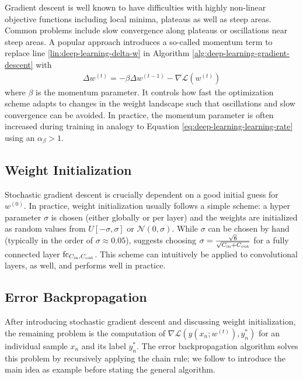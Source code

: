Gradient descent is well known to have difficulties with highly non-linear
objective functions including local minima, plateaus as well as steep areas.
Common problems include slow convergence along plateaus or oscillations near
steep areas. A popular approach introduces a so-called momentum term
\cite[Section~7.5]{Bishop:1995} to replace line \ref{lin:deep-learning-delta-w}
in Algorithm \ref{alg:deep-learning-gradient-descent} with
\begin{align}
  \Delta w^{(t)} = - \beta \Delta w^{(t-1)} - \nabla \mathcal{L}(w^{(t)})
\end{align}
where $\beta$ is the momentum parameter. It controls how fast the optimization
scheme adapts to changes in the weight landscape such that oscillations
and slow convergence can be avoided. In practice, the momentum parameter is
often increased during training in analogy to Equation \eqref{eq:deep-learning-learning-rate}
using an $\alpha_{\beta} > 1$.

\subsection{Weight Initialization}

Stochastic gradient descent is crucially dependent on a good initial guess for~$w^{(0)}$.
In practice, weight initialization
usually follows a simple scheme: a hyper parameter
$\sigma$ is chosen (either globally or per layer) and the weights are initialized
as random values from $U[-\sigma,\sigma]$ or $\mathcal{N}(0, \sigma)$. While
$\sigma$ can be chosen by hand (typically in the order of $\sigma \approx 0.05$),
\cite{GlorotBengio:2010} suggests choosing
$\sigma = \frac{\sqrt{6}}{\sqrt{C_{\text{in}} + C_{\text{out}}}}$ for a fully connected layer
$\text{fc}_{C_{\text{in}}, C_{\text{out}}}$. This scheme can intuitively be applied to convolutional
layers, as well, and performs well in practice.

\subsection{Error Backpropagation}
\label{sec:deep-learning-error-backpropagation}

After introducing stochastic gradient descent and discussing weight initialization,
the remaining problem is the computation of $\nabla \mathcal{L}(y(x_n;w^{(t)}), y^*_n)$
for an individual sample $x_n$ and its label $y^*_n$. The error backpropagation
algorithm \cite{RumelhartHintonWilliams:1986} solves this problem by
recursively applying the chain rule; we follow \cite[Section~4.8]{Bishop:1995}
to introduce the main idea as example before stating the general algorithm.

